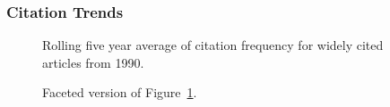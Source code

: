 \documentclass[
  10pt,
  letterpaper,
  DIV=11,
  numbers=noendperiod,
  twoside]{scrartcl}
\begin{document}
\subsubsection*{Citation Trends}\label{citation-trends-14}

\begin{figure}


\caption{\label{fig-citation-spaghetti-1990}Rolling five year average of
citation frequency for widely cited articles from 1990.}

\end{figure}%

\begin{figure}


\caption{\label{fig-citation-facet-1990}Faceted version of
Figure~\ref{fig-citation-spaghetti-1990}.}

\end{figure}%
\end{document}
